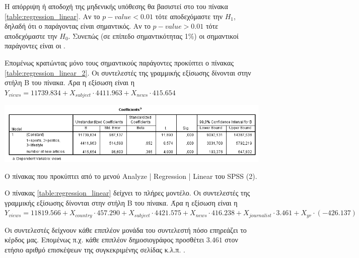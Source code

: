 \documentclass{assignment}
\begin{document}
\begin{Assignment}[Μέρος Γ]
Η απόρριψη ή αποδοχή της μηδενικής υπόθεσης θα βασιστεί στο  του πίνακα \ref{table:regression_linear}. Αν το $p-value<0.01$ τότε αποδεχόμαστε την $H_1$, δηλαδή ότι ο παράγοντας είναι σημαντικός.
Αν το $p-value>0.01$ τότε αποδεχόμαστε την $H_0$. Συνεπώς (σε επίπεδο σημαντικότητας 1\%) οι σημαντικοί παράγοντες είναι οι .

Επομένως κρατώντας μόνο τους σημαντικούς παράγοντες προκύπτει ο πίνακας \ref{table:regression_linear_2}. Οι συντελεστές της γραμμικής εξίσωσης δίνονται στην στήλη B του πίνακα. Άρα η εξίσωση είναι η $Y_{views} = 11739.834 + X_{subject} \cdot 4411.963 + X_{news} \cdot 415.654 $ 

\begin{table}[htbp]
\includegraphics[width=\textwidth]{images/table_regression_linear_2.png}
\caption{Ο πίνακας που προκύπτει από το μενού Analyze | Regression | Linear του SPSS (2).}
\label{table:regression_linear_2}
\end{table}



O πίνακας \ref{table:regression_linear} δείχνει το πλήρες μοντέλο. Οι συντελεστές της γραμμικής εξίσωσης δίνονται στην στήλη B του πίνακα. Άρα η εξίσωση είναι η $Y_{views} = 11819.566 + X_{country} \cdot 457.290 + X_{subject} \cdot 4421.575 + X_{news} \cdot 416.238 + X_{journalist} \cdot 3.461 + X_{yr} \cdot (-426.137) $ 

Οι συντελεστές δείχνουν κάθε επιπλέον μονάδα του συντελεστή πόσο επηρεάζει το κέρδος μας. Επομένως π.χ. κάθε επιπλέον δημοσιογράφος προσθέτει $3.461$  στον ετήσιο αριθμό επισκέψεων της συγκεκριμένης σελίδας κ.λ.π. . 



\end{Assignment}
\end{document}
